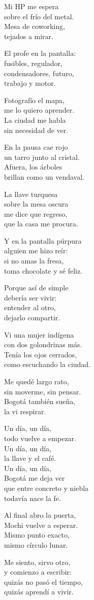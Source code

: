 \begin{lyrics}
Mi HP me espera\\
sobre el frío del metal.\\
Mesa de coworking,\\
tejados a mirar.

El profe en la pantalla:\\
fusibles, regulador,\\
condensadores, futuro,\\
trabajo y motor.

Fotografío el mapa,\\
me lo quiero aprender.\\
La ciudad me habla\\
sin necesidad de ver.

En la pausa cae rojo\\
un tarro junto al cristal.\\
Afuera, los árboles\\
brillan como un vendaval.

La llave turquesa\\
sobre la mesa oscura\\
me dice que regreso,\\
que la casa me procura.

Y en la pantalla púrpura\\
alguien me hizo reír:\\
si no amas la fresa,\\
toma chocolate y sé feliz.

Porque así de simple\\
debería ser vivir:\\
entender al otro,\\
dejarlo compartir.

Vi una mujer indígena\\
con dos golondrinas más.\\
Tenía los ojos cerrados,\\
como escuchando la ciudad.

Me quedé largo rato,\\
sin moverme, sin pensar.\\
Bogotá también sueña,\\
la vi respirar.

Un día, un día,\\
todo vuelve a empezar.\\
Un día, un día,\\
la llave y el café.\\
Un día, un día,\\
Bogotá me deja ver\\
que entre concreto y niebla\\
todavía nace la fe.

Al final abro la puerta,\\
Mochi vuelve a esperar.\\
Mismo punto exacto,\\
mismo círculo lunar.

Me siento, sirvo otro,\\
y comienzo a escribir:\\
quizás no pasó el tiempo,\\
quizás aprendí a vivir.
\end{lyrics}
